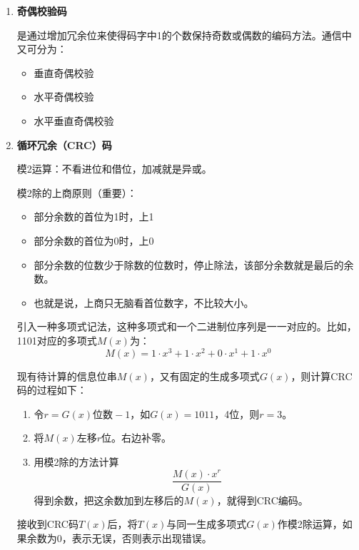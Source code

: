 \documentclass[12pt, a4paper, oneside]{ctexart}
\begin{document}
\begin{enumerate}
    \item {\bf 奇偶校验码}
    
    是通过增加冗余位来使得码字中1的个数保持奇数或偶数的编码方法。通信中又可分为：
    \begin{itemize}
        \item 垂直奇偶校验
        \item 水平奇偶校验
        \item 水平垂直奇偶校验
    \end{itemize}

    \item {\bf 循环冗余（CRC）码}
    
    模2运算：不看进位和借位，加减就是异或。

    模2除的上商原则（重要）：
    \begin{itemize}
        \item 部分余数的首位为1时，上1
        \item 部分余数的首位为0时，上0
        \item 部分余数的位数少于除数的位数时，停止除法，该部分余数就是最后的余数。
        \item 也就是说，上商只无脑看首位数字，不比较大小。
    \end{itemize}
    
    引入一种多项式记法，这种多项式和一个二进制位序列是一一对应的。比如，1101对应的多项式$M(x)$为：
    \begin{equation*}
        M(x)=1\cdot x^3+1\cdot x^2+0\cdot x^1+1\cdot x^0
    \end{equation*}

    现有待计算的信息位串$M(x)$，又有固定的生成多项式$G(x)$，则计算CRC码的过程如下：
    \begin{enumerate}
        \item 令$r=G(x)\text{位数}-1$，如$G(x)=1011$，4位，则$r=3$。
        \item 将$M(x)$左移$r$位。右边补零。
        \item 用模2除的方法计算
        \begin{equation*}
            \frac{M(x)\cdot x^r}{G(x)}
        \end{equation*}
        得到余数，把这余数加到左移后的$M(x)$，就得到CRC编码。
    \end{enumerate}

    接收到CRC码$T(x)$后，将$T(x)$与同一生成多项式$G(x)$作模2除运算，如果余数为0，表示无误，否则表示出现错误。
\end{enumerate}
\end{document}
